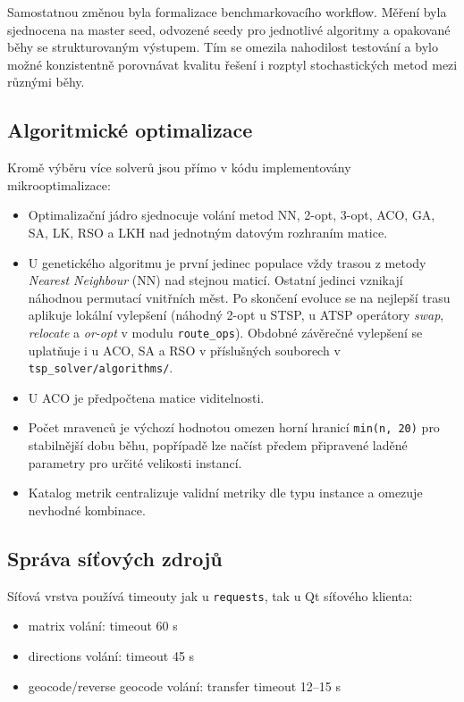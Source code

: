 Samostatnou změnou byla formalizace benchmarkovacího workflow. Měření byla sjednocena na master seed, odvozené seedy pro jednotlivé algoritmy a opakované běhy se strukturovaným výstupem. Tím se omezila nahodilost testování a bylo možné konzistentně porovnávat kvalitu řešení i rozptyl stochastických metod mezi různými běhy.

\subsection{Algoritmické optimalizace}
Kromě výběru více solverů jsou přímo v kódu implementovány mikrooptimalizace:
\begin{itemize}
    \item Optimalizační jádro sjednocuje volání metod NN, 2-opt, 3-opt, ACO, GA, SA, LK, RSO a LKH \cite{lkh_pypi} nad jednotným datovým rozhraním matice.
    \item U genetického algoritmu je první jedinec populace vždy trasou z metody \emph{Nearest Neighbour} (NN) nad stejnou maticí. Ostatní jedinci vznikají náhodnou permutací vnitřních měst. Po skončení evoluce se na nejlepší trasu aplikuje lokální vylepšení (náhodný 2-opt u STSP, u ATSP operátory \emph{swap}, \emph{relocate} a \emph{or-opt} v modulu \texttt{route\_ops}). Obdobné závěrečné vylepšení se uplatňuje i u ACO, SA a RSO v příslušných souborech v \\ \texttt{tsp\_solver/algorithms/}.
    \item U ACO je předpočtena matice viditelnosti.
    \item Počet mravenců je výchozí hodnotou omezen horní hranicí \texttt{min(n, 20)} pro stabilnější dobu běhu, popřípadě lze načíst předem připravené laděné parametry pro určité velikosti instancí.
    \item Katalog metrik centralizuje validní metriky dle typu instance a omezuje nevhodné kombinace.
\end{itemize}

\subsection{Správa síťových zdrojů}
Síťová vrstva používá timeouty jak u \texttt{requests}, tak u Qt síťového klienta:
\begin{itemize}
    \item matrix volání: timeout 60 s
    \item directions volání: timeout 45 s
    \item geocode/reverse geocode volání: transfer timeout 12--15 s
\end{itemize}

